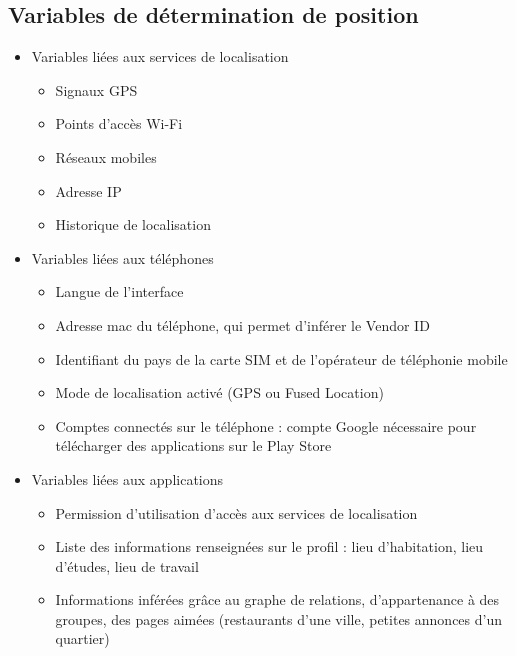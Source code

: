 \documentclass[runningheads]{llncs}
\begin{document}
\clearpage

\begin{appendix}
    \section{Variables de détermination de position}
    \label{appendix:variables}
    \begin{itemize}
    \item Variables liées aux services de localisation
    
    \begin{itemize}
      \item Signaux GPS
      \item Points d'accès Wi-Fi
      \item Réseaux mobiles
      \item Adresse IP
      \item Historique de localisation
    \end{itemize}
    
    \item Variables liées aux téléphones
    
    \begin{itemize}
      \item Langue de l'interface
      \item Adresse mac du téléphone, qui permet d'inférer le Vendor ID
      \item Identifiant du pays de la carte SIM et de l'opérateur de téléphonie mobile
      \item Mode de localisation activé (GPS ou Fused Location)
      \item Comptes connectés sur le téléphone : compte Google nécessaire pour télécharger des applications sur le Play Store
    \end{itemize}
    
    \item Variables liées aux applications
    
    \begin{itemize}
        \item Permission d'utilisation d'accès aux services de localisation
        \item Liste des informations renseignées sur le profil : lieu d'habitation, lieu d'études, lieu de travail
        \item Informations inférées grâce au graphe de relations, d'appartenance à des groupes, des pages aimées (restaurants d'une ville, petites annonces d'un quartier)
    \end{itemize}
    

\end{itemize}
\end{appendix}
\end{document}

